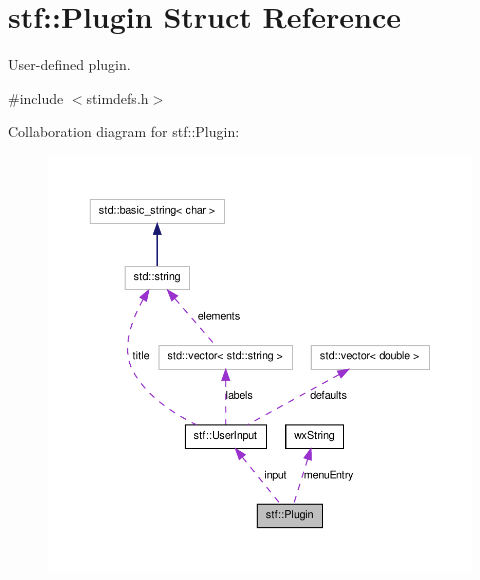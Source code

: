 \hypertarget{structstf_1_1Plugin}{
\section{stf::Plugin Struct Reference}
\label{structstf_1_1Plugin}
}


User-\/defined plugin.  




{\ttfamily \#include $<$stimdefs.h$>$}



Collaboration diagram for stf::Plugin:
\nopagebreak
\begin{figure}[H]
\begin{center}
\leavevmode
\includegraphics[width=396pt]{structstf_1_1Plugin__coll__graph}
\end{center}
\end{figure}
